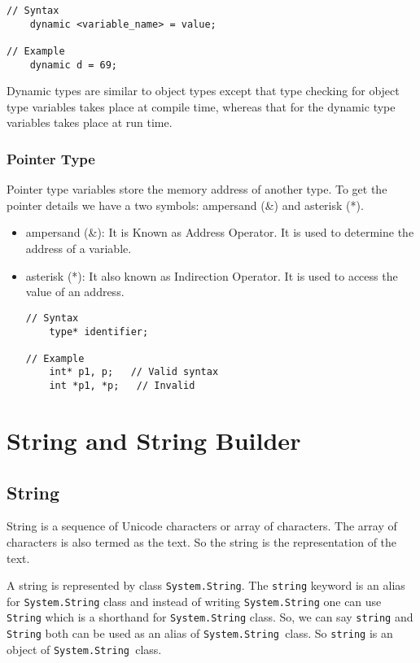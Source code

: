 \begin{lstlisting}
// Syntax
	dynamic <variable_name> = value;

// Example
	dynamic d = 69;
\end{lstlisting}

Dynamic types are similar to object types except that type checking for object type variables takes place at compile time, whereas that for the dynamic type variables takes place at run time.


\subsubsection*{Pointer Type}

	Pointer type variables store the memory address of another type. To get the pointer details we have a two symbols: ampersand (\&) and asterisk (*).

\begin{itemize}
		\item 	ampersand (\&): It is Known as Address Operator. It is used to determine the address of a variable.

		\item 	asterisk (*): It also known as Indirection Operator. It is used to access the value of an address.

\begin{lstlisting}[numbers=none]
// Syntax
	type* identifier;

// Example
	int* p1, p;   // Valid syntax
	int *p1, *p;   // Invalid
\end{lstlisting}


\end{itemize}




\section{String and String Builder}
\subsection{String}
 String is a sequence of Unicode characters or array of characters. The array of characters is also termed as the text. So the string is the representation of the text.

 A string is represented by class \verb|System.String|. The \verb|string| keyword is an alias for \verb|System.String| class and instead of writing \verb|System.String| one can use \verb|String| which is a shorthand for \verb|System.String| class. So, we can say \verb|string| and \verb|String| both can be used as an alias of \verb|System.String |class. So \verb|string| is an object of \verb|System.String |class.

